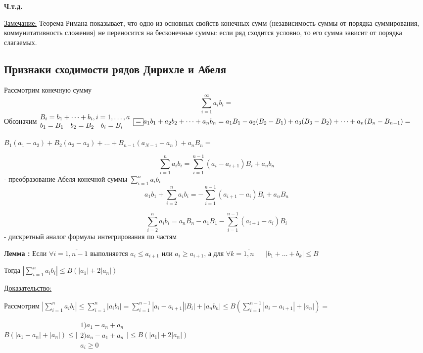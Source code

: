 \documentclass[12pt]{article}
\let\oldsum\sum
\renewcommand{\sum}{\oldsum\limits}
\begin{document}
  \begin{center}
    \textbf{Ч.т.д.}
  \end{center}

  \underline{Замечание:} Теорема Римана показывает, что одно из основных свойств конечных сумм
  (независимость суммы от порядка суммирования, коммунитативность сложения) не переносится на бесконечные суммы:
  если ряд сходится условно, то его сумма зависит от порядка слагаемых.

  \subsection{Признаки сходимости рядов Дирихле и Абеля}
  Рассмотрим конечную сумму
  \[\sum_{i=1}^{\infty} a_i b_i \boxed{=} \]
  Обозначим $
  \begin{matrix}
    B_i=b_1+\dots+b_i, i=1,\dots,a\\
    b_1=B_1 \hspace{10pt} b_2=B_2 \hspace{10pt} b_i=B_i \hspace{10pt}
  \end{matrix}\\
  \boxed{=} a_1b_1+a_2b_2+\dots+a_nb_n=a_1B_1-a_2(B_2-B_1)+a_3(B_3-B_2)+\dots+a_n(B_n-B_{n-1})=
  $
  
  $
  B_1(a_1-a_2)+B_2(a_2-a_3)+\dots+B_{n-1}(a_{N-1}-a_n)+a_n B_n=  $

  \[\sum_{i=1}^{n} a_ib_i = \sum_{i=1}^{n-1} (a_i-a_{i+1})B_i+a_nb_n\]
  - преобразование Абеля конечной суммы $\sum_{i=1}^{n}a_ib_i$
  \[a_1b_1+\sum_{i=2}^{n} a_ib_i=-\sum_{i=1}^{n-1}(a_{i+1}-a_i)B_i+a_nB_n\]

  \[\sum_{i=2}^{n} a_ib_i=a_nB_n-a_1B_1-\sum_{i=1}^{n-1}(a_{i+1}-a_i)B_i\]
  - дискретный аналог формулы интегрирования по частям

  \textbf{Лемма :} Если $\forall i = \overline{1,n-1}$ выполняется $a_i\leq a_{i+1}$ или $a_i\geq a_{i+1}$,
  а для $\forall k = \overline{1,n} \hspace{20pt}|b_1+\dots+b_k|\leq B$

  \begin{center}
    Тогда $|\sum_{i=1}^{n}a_ib_i| \leq B(|a_1|+2|a_n|)$
  \end{center}

  \underline{Доказательство:}
  \begin{adjustwidth}{1.5em}{1.5em}
    Рассмотрим $|\sum_{i=1}^{n} a_ib_i|\leq \sum_{i=1}^{n} |a_ib_i| = \sum_{i=1}^{n-1} |a_i-a_{i+1}||B_i|+|a_nb_n| \leq 
    B(\sum_{i=1}^{n-1} |a_i-a_{i+1}|+|a_n|)=$

    $B(|a_1-a_n|+|a_n|)\leq \Bigg|
    \begin{matrix}
      1) a_1-a_n+a_n\\
      2)a_n-a_1+a_n\\
      a_i\geq 0
    \end{matrix} \Bigg| \leq B(|a_1|+2|a_n|)$
  \end{adjustwidth}
\end{document}
